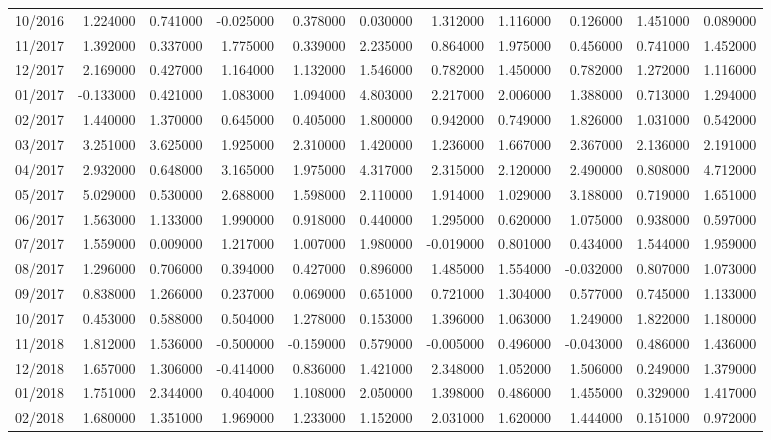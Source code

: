 \begin{tabular}{lrrrrrrrrrr}
10/2016 & 1.224000 & 0.741000 & -0.025000 & 0.378000 & 0.030000 & 1.312000 & 1.116000 & 0.126000 & 1.451000 & 0.089000 \\
11/2017 & 1.392000 & 0.337000 & 1.775000 & 0.339000 & 2.235000 & 0.864000 & 1.975000 & 0.456000 & 0.741000 & 1.452000 \\
12/2017 & 2.169000 & 0.427000 & 1.164000 & 1.132000 & 1.546000 & 0.782000 & 1.450000 & 0.782000 & 1.272000 & 1.116000 \\
01/2017 & -0.133000 & 0.421000 & 1.083000 & 1.094000 & 4.803000 & 2.217000 & 2.006000 & 1.388000 & 0.713000 & 1.294000 \\
02/2017 & 1.440000 & 1.370000 & 0.645000 & 0.405000 & 1.800000 & 0.942000 & 0.749000 & 1.826000 & 1.031000 & 0.542000 \\
03/2017 & 3.251000 & 3.625000 & 1.925000 & 2.310000 & 1.420000 & 1.236000 & 1.667000 & 2.367000 & 2.136000 & 2.191000 \\
04/2017 & 2.932000 & 0.648000 & 3.165000 & 1.975000 & 4.317000 & 2.315000 & 2.120000 & 2.490000 & 0.808000 & 4.712000 \\
05/2017 & 5.029000 & 0.530000 & 2.688000 & 1.598000 & 2.110000 & 1.914000 & 1.029000 & 3.188000 & 0.719000 & 1.651000 \\
06/2017 & 1.563000 & 1.133000 & 1.990000 & 0.918000 & 0.440000 & 1.295000 & 0.620000 & 1.075000 & 0.938000 & 0.597000 \\
07/2017 & 1.559000 & 0.009000 & 1.217000 & 1.007000 & 1.980000 & -0.019000 & 0.801000 & 0.434000 & 1.544000 & 1.959000 \\
08/2017 & 1.296000 & 0.706000 & 0.394000 & 0.427000 & 0.896000 & 1.485000 & 1.554000 & -0.032000 & 0.807000 & 1.073000 \\
09/2017 & 0.838000 & 1.266000 & 0.237000 & 0.069000 & 0.651000 & 0.721000 & 1.304000 & 0.577000 & 0.745000 & 1.133000 \\
10/2017 & 0.453000 & 0.588000 & 0.504000 & 1.278000 & 0.153000 & 1.396000 & 1.063000 & 1.249000 & 1.822000 & 1.180000 \\
11/2018 & 1.812000 & 1.536000 & -0.500000 & -0.159000 & 0.579000 & -0.005000 & 0.496000 & -0.043000 & 0.486000 & 1.436000 \\
12/2018 & 1.657000 & 1.306000 & -0.414000 & 0.836000 & 1.421000 & 2.348000 & 1.052000 & 1.506000 & 0.249000 & 1.379000 \\
01/2018 & 1.751000 & 2.344000 & 0.404000 & 1.108000 & 2.050000 & 1.398000 & 0.486000 & 1.455000 & 0.329000 & 1.417000 \\
02/2018 & 1.680000 & 1.351000 & 1.969000 & 1.233000 & 1.152000 & 2.031000 & 1.620000 & 1.444000 & 0.151000 & 0.972000 \\

\end{tabular}
